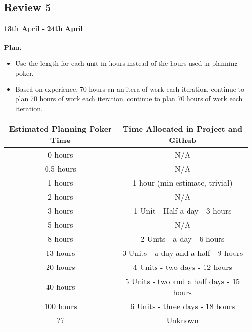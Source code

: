\subsection{Review 5}
\paragraph{13th April - 24th April}

\textbf{Plan:}
\begin{itemize}
\item Use the length for each unit in hours instead of the hours used in planning poker.
\item Based on experience, 70 hours an an itera of work each iteration. continue to plan 70 hours of work each iteration. continue to plan 70 hours of work each iteration.
\end{itemize}

\begin{table}[h]
\begin{tabular}{|c|c|}
\hline
Estimated Planning Poker Time & Time Allocated in Project and Github     \\ \hline
0 hours                       & N/A                                      \\ \hline
0.5 hours                     & N/A                                      \\ \hline
1 hours                       & 1 hour (min estimate, trivial)           \\ \hline
2 hours                       & N/A                                      \\ \hline
3 hours                       & 1 Unit - Half a day - 3 hours            \\ \hline
5 hours                       & N/A                                      \\ \hline
8 hours                       & 2 Units - a day - 6 hours                \\ \hline
13 hours                      & 3 Units - a day and a half - 9 hours     \\ \hline
20 hours                      & 4 Units - two days - 12 hours            \\ \hline
40 hours                      & 5 Units - two and a half days - 15 hours \\ \hline
100 hours                     & 6 Units - three days - 18 hours          \\ \hline
??                            & Unknown                                  \\ \hline
\end{tabular}
\label{tbl:units}
\end{table}

